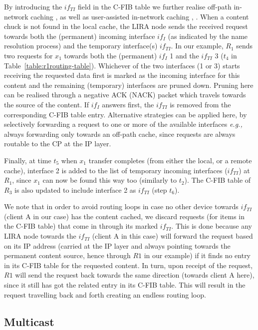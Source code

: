 \documentclass{sig-alternate}
\newcommand{\eg}{{\em e.g.,\/ }}
\begin{document}
By introducing the $if_{TI}$ field in the C-FIB table we further realise off-path in-network caching \cite{scan}, as well as user-assisted in-network caching \cite{userAssistedCaching}, \cite{sit-networking-sourlas}. When a content chuck is not found in the local cache, the LIRA node sends the received request towards both the (permanent) incoming interface $if_I$ (as indicated by the name resolution process) and the temporary interface(s) $if_{TI}$. In our example, $R_1$ sends two requests for $x_1$ towards both the (permanent) $if_I$ 1 and the $if_{TI}$ 3 ($t_4$ in Table~\ref{table:r1routing-table}). Whichever of the two interfaces (1 or 3) starts receiving the requested data first is marked as the incoming interface for this content and the remaining (temporary) interfaces are pruned down. Pruning here can be realised through a negative ACK (NACK) packet which travels towards the source of the content. If $if_I$ answers first, the $if_{TI}$ is removed from the corresponding C-FIB table entry. Alternative strategies can be applied here, by selectively forwarding a request to one or more of the available interfaces \eg always forwarding only towards an off-path cache, since requests are always routable to the CP at the IP layer.

Finally, at time $t_5$ when $x_1$ transfer completes (from either the local, or a remote cache), interface 2 is added to the list of temporary incoming interfaces ($if_{TI}$) at $R_1$, since $x_1$ can now be found this way too (similarly to $t_2$). The C-FIB table of $R_3$ is  also updated to include interface 2 as $if_{TI}$ (step $t_6$).

We note that in order to avoid routing loops in case no other device towards $if_{TI}$ (client A in our case) has the content cached, we discard requests (for items in the C-FIB table) that come in through its marked $if_{TI}$. This is done because any LIRA node towards the $if_{TI}$ (client A in this case) will forward the request based on its IP address (carried at the IP layer and always pointing towards the permanent content source, hence through $R1$ in our example) if it finds no entry in its C-FIB table for the requested content.
In turn, upon receipt of the request, $R1$ will send the request back towards the same direction (towards client A here), since it still has got the related entry in its C-FIB table. This will result in the request travelling back and forth creating an endless routing loop.


\subsection{Multicast}\label{multicast}
\end{document}
